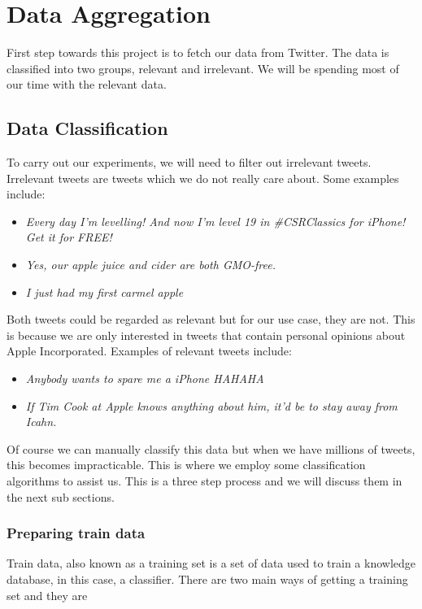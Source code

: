 
\chapter{Data Aggregation}
First step towards this project is to fetch our data from Twitter. The data is classified into two
groups, relevant and irrelevant. We will be spending most of our time with the relevant data.


\section{Data Classification}
To carry out our experiments, we will need to filter out irrelevant tweets. Irrelevant tweets are
tweets which we do not really care about. Some examples include:

\begin{itemize}
  \item \textit{Every day I'm levelling! And now I'm level 19 in \#CSRClassics for iPhone! Get it for FREE!}
  \item \textit{Yes, our apple juice and cider are both GMO-free.}
  \item \textit{I just had my first carmel apple}
\end{itemize}

Both tweets could be regarded as relevant but for our use case, they are not. This is because we are
only interested in tweets that contain personal opinions about Apple Incorporated. Examples of
relevant tweets include:

\begin{itemize}
  \item \textit{Anybody wants to spare me a iPhone HAHAHA}
  \item \textit{If Tim Cook at Apple knows anything about him, it'd be to stay away from Icahn.}
\end{itemize}

Of course we can manually classify this data but when we have millions of tweets, this becomes
impracticable. This is where we employ some classification algorithms to assist us. This is a
three step process and we will discuss them in the next sub sections.

\subsection{Preparing train data}
Train data, also known as a training set is a set of data used to train a knowledge database, in
this case, a classifier. There are two main ways of getting a training set and they are

